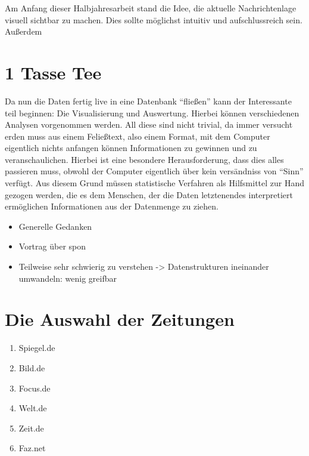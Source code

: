 \documentclass[12pt,ngerman,a4paperpaper,]{paper}
\providecommand{\tightlist}{%
  \setlength{\itemsep}{0pt}\setlength{\parskip}{0pt}}
\begin{document}
Am Anfang dieser Halbjahresarbeit stand die Idee, die aktuelle
Nachrichtenlage visuell sichtbar zu machen. Dies sollte möglichst
intuitiv und aufschlussreich sein. Außerdem

\section{1 Tasse Tee}\label{tasse-tee}

Da nun die Daten fertig live in eine Datenbank ``fließen'' kann der
Interessante teil beginnen: Die Visualisierung und Auswertung. Hierbei
können verschiedenen Analysen vorgenommen werden. All diese sind nicht
trivial, da immer versucht erden muss aus einem Feließtext, also einem
Format, mit dem Computer eigentlich nichts anfangen können Informationen
zu gewinnen und zu veranschaulichen. Hierbei ist eine besondere
Herausforderung, dass dies alles passieren muss, obwohl der Computer
eigentlich über kein versändniss von ``Sinn'' verfügt. Aus diesem Grund
müssen statistische Verfahren als Hilfsmittel zur Hand gezogen werden,
die es dem Menschen, der die Daten letztenendes interpretiert
ermöglichen Informationen aus der Datenmenge zu ziehen.

\begin{itemize}
\tightlist
\item
  Generelle Gedanken
\item
  Vortrag über spon
\item
  Teilweise sehr schwierig zu verstehen -\textgreater{} Datenstrukturen
  ineinander umwandeln: wenig greifbar
\end{itemize}

\section{Die Auswahl der Zeitungen}\label{die-auswahl-der-zeitungen}

\begin{enumerate}
\def\labelenumi{\arabic{enumi}.}
\tightlist
\item
  Spiegel.de
\item
  Bild.de
\item
  Focus.de
\item
  Welt.de
\item
  Zeit.de
\item
  Faz.net
\end{enumerate}
\end{document}
